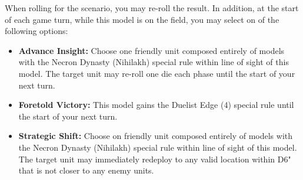 When rolling for the scenario, you may re-roll the result. In addition, at the start of each game turn, while this model is on the field, you may select on of the following options:
\begin{itemize}
	\item \textbf{Advance Insight:} Choose one friendly unit composed entirely of models with the Necron Dynasty (Nihilakh) special rule within line of sight of this model. The target unit may re-roll one die each phase until the start of your next turn.
	\item \textbf{Foretold Victory:} This model gains the Duelist Edge (4) special rule until the start of your next turn.
	\item \textbf{Strategic Shift:} Choose on friendly unit composed entirely of models with the Necron Dynasty (Nihilakh) special rule within line of sight of this model. The target unit may immediately redeploy to any valid location within D6" that is not closer to any enemy units.
\end{itemize}
